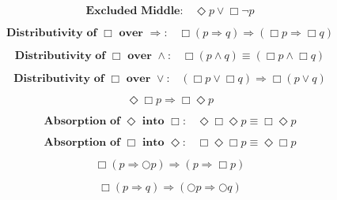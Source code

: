 \documentclass[fleqn, leqno]{article}
\newcommand{\next}{\bigcirc}
\newcommand{\event}{\Diamond}
\newcommand{\always}{\Box}
\newcommand{\spacer}{\vspace{-30pt}}
\begin{document}
\spacer

\begin{equation}\label{E:excludedMid}
\textbf{Excluded Middle:}\quad \event p \lor \always\lnot p
\end{equation}

\spacer

\begin{equation}\label{E:distAlwaysImp}
\textbf{Distributivity of $\always$ over $\Rightarrow$:}\quad \always (p \Rightarrow q) \Rightarrow (\always p \Rightarrow \always q)
\end{equation}

\spacer

\begin{equation}\label{E:distAlwaysAnd}
\textbf{Distributivity of $\always$ over $\land$:}\quad \always (p \land q) \equiv (\always p \land \always q)
\end{equation}

\spacer

\begin{equation}\label{E:distAlwaysOr}
\textbf{Distributivity of $\always$ over $\lor$:}\quad (\always p \lor \always q) \Rightarrow \always (p \lor q)
\end{equation}

\spacer

\begin{equation}\label{E:eventAlwaysImp}
\event\always p \Rightarrow \always\event p
\end{equation}

\spacer

\begin{equation}\label{E:absEvent}
\textbf{Absorption of $\event$ into $\always$:}\quad \event\always\event p \equiv \always\event p
\end{equation}

\spacer

\begin{equation}\label{E:absAlways}
\textbf{Absorption of $\always$ into $\event$:}\quad \always\event\always p \equiv \event\always p
\end{equation}

\spacer

\begin{equation}\label{E:alwaysImpNext}
\always (p \Rightarrow \next p) \Rightarrow (p \Rightarrow \always p)
\end{equation}

\spacer

\begin{equation}\label{E:alwaysImpNexts}
\always (p \Rightarrow q) \Rightarrow (\next p \Rightarrow \next q)
\end{equation}
\end{document}
